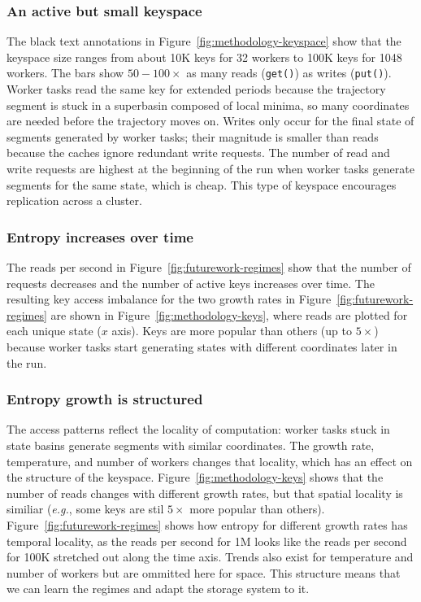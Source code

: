 \subsubsection*{An active but small keyspace} The black text annotations in
Figure~\ref{fig:methodology-keyspace} show that the keyspace size ranges from
about 10K keys for 32 workers to 100K keys for 1048 workers.  The bars show
\(50-100\times\) as many reads (\texttt{get()}) as writes (\texttt{put()}).
Worker tasks read the same key for extended periods because the trajectory segment
is stuck in a superbasin composed of local minima, so many coordinates are
needed before the trajectory moves on. Writes only occur for the final state of
segments generated by worker tasks; their magnitude is smaller than reads because
the caches ignore redundant write requests. The number of read and write requests
are highest at the beginning of the run when worker tasks generate segments for the
same state, which is cheap. This type of keyspace encourages replication across
a cluster.  

\subsubsection*{Entropy increases over time} The reads per second in
Figure~\ref{fig:futurework-regimes} show that the number of requests decreases
and the number of active keys increases over time. The resulting key access
imbalance for the two growth rates in Figure~\ref{fig:futurework-regimes} are
shown in Figure~\ref{fig:methodology-keys}, where reads are plotted for each
unique state (\(x\) axis). Keys are more popular than others (up to
\(5\times\)) because worker tasks start generating states with different
coordinates later in the run.

\subsubsection*{Entropy growth is structured} The access patterns reflect the
locality of computation: worker tasks stuck in state basins generate segments with
similar coordinates. The growth rate, temperature, and number of workers
changes that locality, which has an effect on the structure of the keyspace.
Figure~\ref{fig:methodology-keys} shows that the number of reads changes with
different growth rates, but that spatial locality is similiar ({\it e.g.}, some
keys are stil \(5\times\) more popular than others).
Figure~\ref{fig:futurework-regimes} shows how entropy for different growth
rates has temporal locality, as the reads per second for 1M looks like the
reads per second for 100K stretched out along the time axis.  Trends also exist
for temperature and number of workers but are ommitted here for space. This
structure means that we can learn the regimes and adapt the storage system to
it. 

